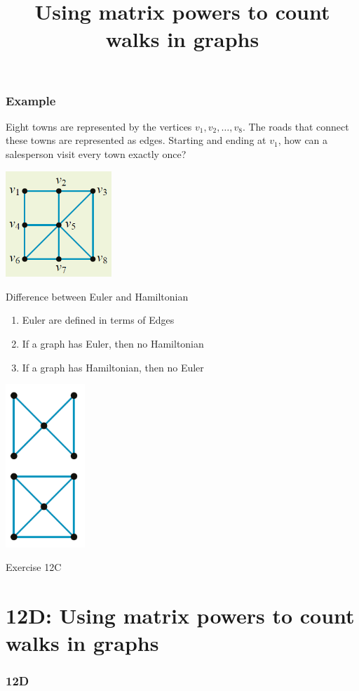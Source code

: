 \documentclass[
	11pt, %
]{beamer}
\begin{document}
\begin{frame}[t]
    \frametitle{Example}
    Eight towns are represented by the vertices $v_1, v_2, \ldots, v_8$. The
roads that connect these towns are represented as edges. Starting
and ending at $v_1$, how can a salesperson visit every town exactly
once?
    \begin{center}
        \includegraphics[width = 4cm]{Graph13.png}
    \end{center}
\end{frame}

\begin{frame}{Difference between Euler and Hamiltonian}
    \begin{enumerate}
        \item \alert{E}uler are defined in terms of \alert{E}dges
        \item If a graph has Euler, then no Hamiltonian
        \item If a graph has Hamiltonian, then no Euler
    \end{enumerate}
    \includegraphics[width = 3cm]{Graph14.png}
\end{frame}

\begin{frame}{Exercise 12C}
\end{frame}

\section{12D: Using matrix powers to count walks in graphs}
\begin{frame}
    \frametitle{12D}
    \begin{center}
        \title{Using matrix powers to count walks in graphs}
        \maketitle
    \end{center}
\end{frame}
\end{document}
